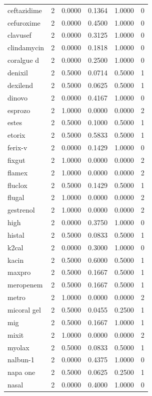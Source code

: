 \begin{longtable}{p{3.0cm}rrrrr}
ceftazidime & 2 & 0.0000 & 0.1364 & 1.0000 & 0 \\
cefuroxime & 2 & 0.0000 & 0.4500 & 1.0000 & 0 \\
clavusef & 2 & 0.0000 & 0.3125 & 1.0000 & 0 \\
clindamycin & 2 & 0.0000 & 0.1818 & 1.0000 & 0 \\
coralgue d & 2 & 0.0000 & 0.2500 & 1.0000 & 0 \\
denixil & 2 & 0.5000 & 0.0714 & 0.5000 & 1 \\
dexilend & 2 & 0.5000 & 0.0625 & 0.5000 & 1 \\
dinovo & 2 & 0.0000 & 0.4167 & 1.0000 & 0 \\
esprozo & 2 & 1.0000 & 0.0000 & 0.0000 & 2 \\
estes & 2 & 0.5000 & 0.1000 & 0.5000 & 1 \\
etorix & 2 & 0.5000 & 0.5833 & 0.5000 & 1 \\
ferix-v & 2 & 0.0000 & 0.1429 & 1.0000 & 0 \\
fixgut & 2 & 1.0000 & 0.0000 & 0.0000 & 2 \\
flamex & 2 & 1.0000 & 0.0000 & 0.0000 & 2 \\
fluclox & 2 & 0.5000 & 0.1429 & 0.5000 & 1 \\
flugal & 2 & 1.0000 & 0.0000 & 0.0000 & 2 \\
gestrenol & 2 & 1.0000 & 0.0000 & 0.0000 & 2 \\
high & 2 & 0.0000 & 0.3750 & 1.0000 & 0 \\
histal & 2 & 0.5000 & 0.0833 & 0.5000 & 1 \\
k2cal & 2 & 0.0000 & 0.3000 & 1.0000 & 0 \\
kacin & 2 & 0.5000 & 0.6000 & 0.5000 & 1 \\
maxpro & 2 & 0.5000 & 0.1667 & 0.5000 & 1 \\
meropenem & 2 & 0.5000 & 0.1667 & 0.5000 & 1 \\
metro & 2 & 1.0000 & 0.0000 & 0.0000 & 2 \\
micoral gel & 2 & 0.5000 & 0.0455 & 0.2500 & 1 \\
mig & 2 & 0.5000 & 0.1667 & 1.0000 & 1 \\
mixit & 2 & 1.0000 & 0.0000 & 0.0000 & 2 \\
myolax & 2 & 0.5000 & 0.0833 & 0.5000 & 1 \\
nalbun-1 & 2 & 0.0000 & 0.4375 & 1.0000 & 0 \\
napa one & 2 & 0.5000 & 0.0625 & 0.2500 & 1 \\
nasal & 2 & 0.0000 & 0.4000 & 1.0000 & 0 \\

\end{longtable}
